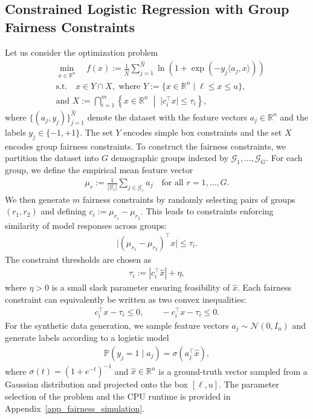 \documentclass{article}
\theoremstyle{plain}
\theoremstyle{definition}
\theoremstyle{remark}
\begin{document}
\subsection{Constrained Logistic Regression with Group Fairness Constraints}

Let us consider the optimization problem
\begin{align*}
&\min_{x \in \mathbb{R}^n} \quad f(x) := \frac{1}{\widehat N} \sum_{j=1}^{\widehat N} \ln\!\left(1 + \exp(-y_j \langle a_j, x \rangle)\right) \\
&\text{s.t.} \quad x \in Y \cap X, \text{ where } Y := \{ x \in \mathbb{R}^n \mid \ell \leq x \leq u \}, \\
&\text{and } X := \bigcap_{i=1}^m \left\{ x \in \mathbb{R}^n \;\middle|\; \big| c_i^\top x \big| \leq \tau_i \right\},
\end{align*}
where $\{(a_j,y_j)\}_{j=1}^{\widehat N}$ denote the dataset with the feature vectors $a_j \in \mathbb{R}^n$ and the labels $y_j \in \{-1,+1\}$. The set $Y$ encodes simple box constraints and the set $X$ encodes group fairness constraints. To construct the fairness constraints, we partition the dataset into $G$ demographic groups indexed by $\mathcal{G}_1,\ldots,\mathcal{G}_G$. For each group, we define the empirical mean feature vector
\begin{align*}
    \mu_r := \frac{1}{|\mathcal{G}_r|} \sum_{j \in \mathcal{G}_r} a_j \quad \text{for all } r= 1,\ldots,G.
\end{align*}
We then generate $m$ fairness constraints by randomly selecting pairs of groups $(r_1,r_2)$ and defining $c_i := \mu_{r_1} - \mu_{r_2}$. This leads to constraints enforcing similarity of model responses across groups:
\begin{align*}
    \big| (\mu_{r_1} - \mu_{r_2})^\top x \big| \leq \tau_i .
\end{align*}
The constraint thresholds are chosen as 
\begin{align*}
    \tau_i := \left| c_i^\top \widehat x \right| + \eta ,
\end{align*}
where $\eta > 0$ is a small slack parameter ensuring feasibility of $\widehat x$. Each fairness constraint can equivalently be written as two convex inequalities:
\begin{align*}
c_i^\top x - \tau_i \leq 0,
\qquad
-c_i^\top x - \tau_i \leq 0.
\end{align*}
For the synthetic data generation, we sample feature vectors $a_j \sim \mathcal{N}(0, I_n)$ and generate labels according to a logistic model
\begin{align*}
\mathbb{P}(y_j = 1 \mid a_j) = \sigma(a_j^\top \widehat x),
\end{align*}
where $\sigma(t) = (1 + e^{-t})^{-1}$ and $\widehat x \in \mathbb{R}^n$ is a ground-truth vector sampled from a Gaussian distribution and projected onto the box $[\ell,u]$. The parameter selection of the problem and the CPU runtime is provided in Appendix~\ref{app_fairness_simulation}.
\end{document}
